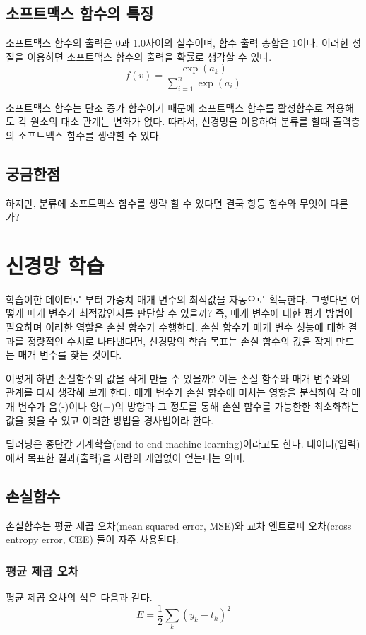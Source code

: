 \documentclass[12pt]{article}
\begin{document}
	\subsection{소프트맥스 함수의 특징}
	소프트맥스 함수의 출력은 0과 1.0사이의 실수이며, 함수 출력 총합은 1이다.
	이러한 성질을 이용하면 소프트맥스 함수의 출력을 확률로 생각할 수 있다.
	\[ f(v) = \frac{\exp(a_{k})} {\sum_{i=1}^{n}  {\exp(a_{i})}} \]
	
	소프트맥스 함수는 단조 증가 함수이기 때문에 소프트맥스 함수를 활성함수로 적용해도 각 원소의 대소 관계는 변화가 없다. 따라서, 신경망을 이용하여 분류를 할때 출력층의 소프트맥스 함수를 생략할 수 있다.
	
	\subsection{궁금한점}
	하지만, 분류에 소프트맥스 함수를 생략 할 수 있다면 결국 항등 함수와 무엇이 다른가?
	\clearpage
	
\section{신경망 학습}
학습이한 데이터로 부터 가중치 매개 변수의 최적값을 자동으로 획득한다.
그렇다면 어떻게 매개 변수가 최적값인지를 판단할 수 있을까?
즉, 매개 변수에 대한 평가 방법이 필요하며 이러한 역할은 손실 함수가 수행한다.
손실 함수가 매개 변수 성능에 대한 결과를 정량적인 수치로 나타낸다면, 
신경망의 학습 목표는 손실 함수의 값을 작게 만드는 매개 변수를 찾는 것이다.

어떻게 하면 손실함수의 값을 작게 만들 수 있을까?
이는 손실 함수와 매개 변수와의 관계를 다시 생각해 보게 한다.
매개 변수가 손실 함수에 미치는 영향을 분석하여 각 매개 변수가 음(-)이나 양(+)의 방향과 그 정도를 통해
손실 함수를 가능한한 최소화하는 값을 찾을 수 있고 이러한 방법을 경사법이라 한다.


딥러닝은 종단간 기계학습(end-to-end machine learning)이라고도 한다. 데이터(입력)에서 목표한 결과(출력)을 사람의 개입없이 얻는다는 의미.

\subsection{손실함수}

손실함수는 평균 제곱 오차(mean squared error, MSE)와 교차 엔트로피 오차(cross entropy error, CEE) 둘이 자주 사용된다.
\subsubsection{평균 제곱 오차}
평균 제곱 오차의 식은 다음과 같다.
\[ E = \frac{1}{2} \sum_{k}(y_{k} - t_{k})^2  \]
\end{document}
